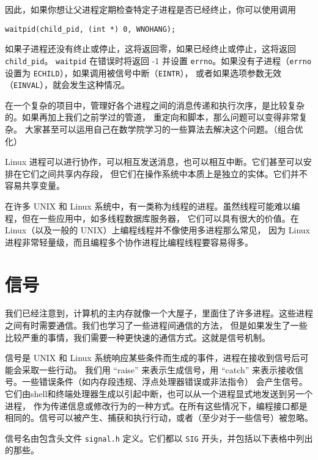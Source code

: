 \documentclass{ctexart}
\begin{document}
因此，如果你想让父进程定期检查特定子进程是否已经终止，你可以使用调用  
  
\begin{verbatim}  
waitpid(child_pid, (int *) 0, WNOHANG);  
\end{verbatim}  
  
如果子进程还没有终止或停止，这将返回零，如果已经终止或停止，这将返回 \texttt{child\_pid}。 
\texttt{waitpid} 在错误时将返回 -1 并设置 \texttt{errno}。如果没有子进程（\texttt{errno} 
设置为 \texttt{ECHILD}），如果调用被信号中断（\texttt{EINTR}），
或者如果选项参数无效（\texttt{EINVAL}），就会发生这种情况。  

在一个复杂的项目中，管理好各个进程之间的消息传递和执行次序，是比较复杂的。如果再加上我们之前学过的管道，
重定向和脚本，那么问题可以变得非常复杂。
大家甚至可以运用自己在数学院学习的一些算法去解决这个问题。（组合优化）

Linux 进程可以进行协作，可以相互发送消息，也可以相互中断。它们甚至可以安排在它们之间共享内存段，
但它们在操作系统中本质上是独立的实体。它们并不容易共享变量。  
  
在许多 UNIX 和 Linux 系统中，有一类称为线程的进程。虽然线程可能难以编程，但在一些应用中，如多线程数据库服务器，
它们可以具有很大的价值。在 Linux（以及一般的 UNIX）上编程线程并不像使用多进程那么常见，
因为 Linux 进程非常轻量级，而且编程多个协作进程比编程线程要容易得多。

\section{信号}  

我们已经注意到，计算机的主内存就像一个大屋子，里面住了许多进程。这些进程之间有时需要通信。我们也学习了一些进程间通信的方法，
但是如果发生了一些比较严重的事情，我们需要一种更快速的通信方式。这就是信号机制。

信号是 UNIX 和 Linux 系统响应某些条件而生成的事件，进程在接收到信号后可能会采取一些行动。
我们用 ``raise'' 来表示生成信号，用 ``catch'' 来表示接收信号。一些错误条件（如内存段违规、浮点处理器错误或非法指令）
会产生信号。它们由shell和终端处理器生成以引起中断，也可以从一个进程显式地发送到另一个进程，
作为传递信息或修改行为的一种方式。在所有这些情况下，编程接口都是相同的。信号可以被产生、捕获和执行行动，或者（至少对于一些信号）被忽略。  

信号名由包含头文件 \texttt{signal.h} 定义。它们都以 \texttt{SIG} 开头，并包括以下表格中列出的那些。  
\end{document}
